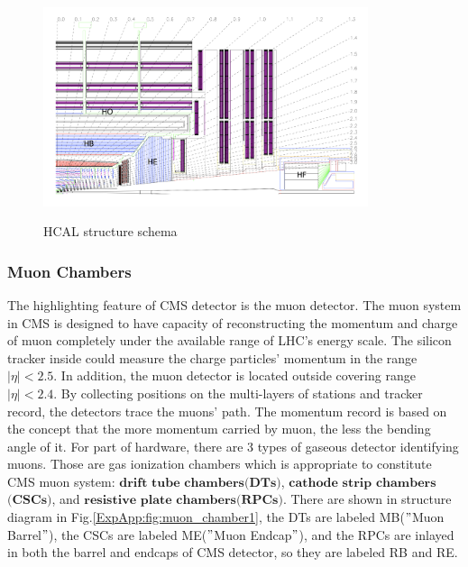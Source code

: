 			\begin{figure}[H]
			\centering{}
		    	\includegraphics[width=0.85\textwidth]{Figures/ExpApparatus/HCAL1.png}\\
			\caption{HCAL structure schema\cite{Chatrchyan:2008aa}}
			\label{ExpApp:fig:HCAL1}
			\end{figure}
			\FloatBarrier

		\subsubsection{Muon Chambers}
		\label{sssec:muon_detector}

			The highlighting feature of CMS detector is the muon detector. The muon system in CMS is designed to have capacity of reconstructing the momentum and charge of muon completely under the available range of LHC's energy scale. The silicon tracker inside could measure the charge particles' momentum in the range $|\eta|<2.5$. In addition, the muon detector is located outside covering range $|\eta|<2.4$. By collecting positions on the multi-layers of stations and tracker record, the detectors trace the muons' path. The momentum record is based on the concept that the more momentum carried by muon, the less the bending angle of it. For part of hardware, there are 3 types of gaseous detector identifying muons. Those are gas ionization chambers which is appropriate to constitute CMS muon system: $\textbf{drift}$ $\textbf{tube}$ $\textbf{chambers}$$\textbf{(DTs)}$, $\textbf{cathode}$ $\textbf{strip}$ $\textbf{chambers}$$\textbf{(CSCs)}$, and $\textbf{resistive}$ $\textbf{plate}$ $\textbf{chambers}$$\textbf{(RPCs)}$. There are shown in structure diagram in Fig.\ref{ExpApp:fig:muon_chamber1}, the DTs are labeled MB($"$Muon Barrel$"$), the CSCs are labeled ME($"$Muon Endcap$"$), and the RPCs are inlayed in both the barrel and endcaps of CMS detector, so they are labeled RB and RE.

